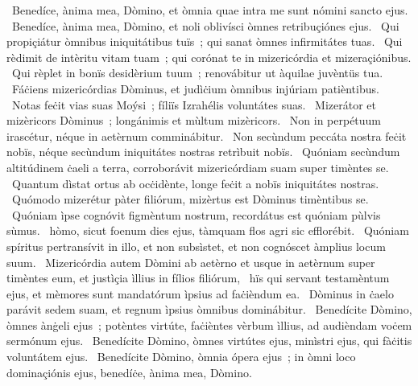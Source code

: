 ~Benedíce, ànima mea, Dòmino, et òmnia quae intra me sunt nómini sancto ejus. 
~Benedíce, ànima mea, Dòmino, et noli oblivísci òmnes retribuçiónes ejus. 
~Qui propiçiátur òmnibus iniquitátibus tuïs~; qui sanat òmnes infirmitátes tuas. 
~Qui rèdimit de intèritu vitam tuam~; qui corónat te in mizericórdia et mizeraçiónibus. 
~Qui rèplet in bonïs desidèrium tuum~; renovábitur ut àquilae juvèntüs tua. 
~Fáċiens mizericórdias Dòminus, et judìċium òmnibus injúriam patièntibus. 
~Notas feċit vias suas Moýsi~; fíliïs Izrahélis voluntátes suas. 
~Mizerátor et mizèricors Dòminus~; longánimis et mùltum mizèricors. 
~Non in perpétuum irascétur, néque in aetèrnum comminábitur. 
~Non secùndum peccáta nostra feċit nobïs, néque secùndum iniquitátes nostras retrìbuit nobïs. 
~Quóniam secùndum altitúdinem ċaeli a terra, corroborávit mizericórdiam suam super timèntes se. 
~Quantum dìstat ortus ab ocċidènte, longe feċit a nobïs iniquitátes nostras. 
~Quómodo mizerétur pàter filiórum, mizèrtus est Dòminus timèntibus se. 
~Quóniam ìpse cognóvit figmèntum nostrum, recordátus est quóniam pùlvis sùmus. 
~hòmo, sicut foenum dies ejus, tàmquam flos agri sic efflorébit. 
~Quóniam spíritus pertransívit in illo, et non subsìstet, et non cognóscet àmplius locum suum. 
~Mizericórdia autem Dòmini ab aetèrno et usque in aetèrnum super timèntes eum, et justìçia ìllius in fílios filiórum, 
~hïs qui servant testamèntum ejus, et mèmores sunt mandatórum ìpsius ad faċièndum ea. 
~Dòminus in ċaelo parávit sedem suam, et regnum ìpsius òmnibus dominábitur. 
~Benedícite Dòmino, òmnes ànġeli ejus~; potèntes virtúte, faċièntes vèrbum ìllius, ad audièndam voċem sermónum ejus. 
~Benedícite Dòmino, òmnes virtútes ejus, minìstri ejus, qui fàċitis voluntátem ejus. 
~Benedícite Dòmino, òmnia ópera ejus~; in òmni loco dominaçiónis ejus, benedíċe, ànima mea, Dòmino. 
